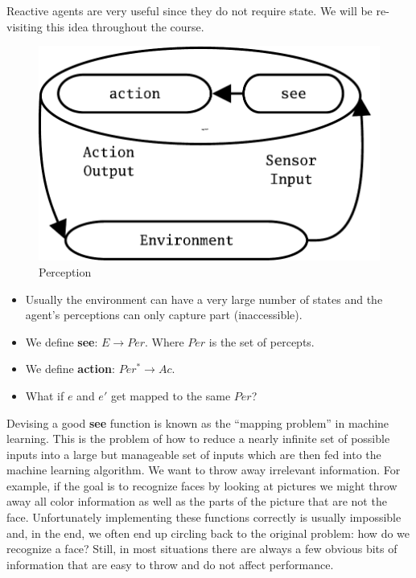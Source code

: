 Reactive agents are very useful since they do not require state. We
will be re-visiting this idea throughout the course.


\begin{figure}
  \centering
  \includegraphics[width=\textwidth]{formalmodels/perception}
  \caption{Perception}
  \label{fig:perception}
\end{figure}
\begin{itemize}
\item Usually the environment can have a very large number of
  states and the agent's perceptions can only capture part
  (inaccessible). 
  
\item We define \textbf{see}: $E \rightarrow Per$. Where $Per$ is the set
  of percepts. 
  
\item We define \textbf{action}: $Per^{*} \rightarrow Ac$.
  
\item What if $e$ and $e'$ get mapped to the same $Per$? 
  
\end{itemize}

Devising a good \textbf{see} function is known as the ``mapping
problem'' in machine learning. This is the problem of how to reduce a
nearly infinite set of possible inputs into a large but manageable set
of inputs which are then fed into the machine learning algorithm. We
want to throw away irrelevant information. For example, if the goal is
to recognize faces by looking at pictures we might throw away all
color information as well as the parts of the picture that are not the
face. Unfortunately implementing these functions correctly is
usually impossible and, in the end, we often end up circling back to
the original problem: how do we recognize a face? Still, in most
situations there are always a few obvious bits of information that are
easy to throw and do not affect performance.

